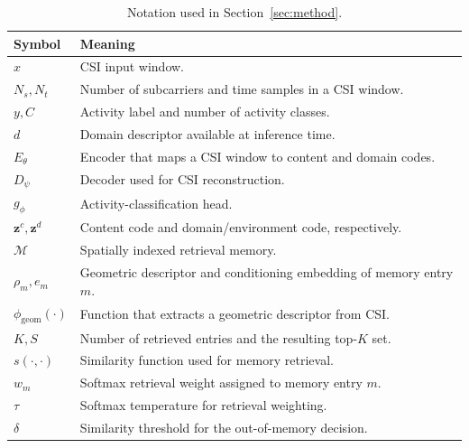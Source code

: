 \documentclass[conference]{IEEEtran}
\begin{document}
\begin{table}[h] %
\centering
\caption{Notation used in Section~\ref{sec:method}.}
\label{tab:notation}
\small
\begin{tabular}{p{}p{}}
\toprule
\textbf{Symbol} & \textbf{Meaning} \\
\midrule
$x$ & CSI input window. \\
$N_s, N_t$ & Number of subcarriers and time samples in a CSI window. \\
$y, C$ & Activity label and number of activity classes. \\
$d$ & Domain descriptor available at inference time. \\
$E_\theta$ & Encoder that maps a CSI window to content and domain codes. \\
$D_\psi$ & Decoder used for CSI reconstruction. \\
$g_\phi$ & Activity-classification head. \\
$\mathbf{z}^c, \mathbf{z}^d$ & Content code and domain/environment code, respectively. \\
$\mathcal{M}$ & Spatially indexed retrieval memory. \\
$\rho_m, e_m$ & Geometric descriptor and conditioning embedding of memory entry $m$. \\
$\phi_{\mathrm{geom}}(\cdot)$ & Function that extracts a geometric descriptor from CSI. \\
$K, S$ & Number of retrieved entries and the resulting top-$K$ set. \\
$s(\cdot,\cdot)$ & Similarity function used for memory retrieval. \\
$w_m$ & Softmax retrieval weight assigned to memory entry $m$. \\
$\tau$ & Softmax temperature for retrieval weighting. \\
$\delta$ & Similarity threshold for the out-of-memory decision. \\
\bottomrule
\end{tabular}
\end{table}
\end{document}
